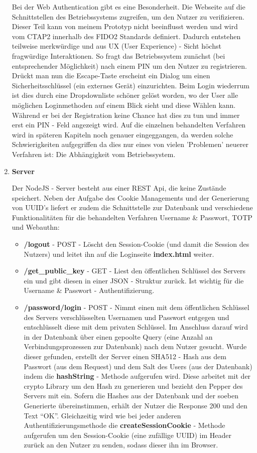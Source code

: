 \begin{enumerate}
Bei der Web Authentication gibt es eine Besonderheit. Die Webseite auf die Schnittstellen des Betriebssystems zugreifen, um den Nutzer zu verifizieren. Dieser Teil kann von meinem Prototyp nicht beeinflusst werden und wird vom CTAP2 innerhalb des FIDO2 Standards definiert. Dadurch entstehen teilweise merkwürdige und aus UX (User Experience) - Sicht höchst fragwürdige Interaktionen. So fragt das Betriebssystem zunächst (bei entsprechender Möglichkeit) nach einem PIN um den Nutzer zu registrieren. Drückt man nun die Escape-Taste erscheint ein Dialog um einen Sicherheitsschlüssel (ein externes Gerät) einzurichten. Beim Login wiederrum ist dies durch eine Dropdownliste schöner gelöst worden, wo der User alle möglichen Loginmethoden auf einem Blick sieht und diese Wählen kann. Während er bei der Registration keine Chance hat dies zu tun und immer erst ein PIN - Feld angezeigt wird. Auf die einzelnen behandelten Verfahren wird in späteren Kapiteln noch genauer eingeggangen, da werden solche Schwierigkeiten aufgegriffen da dies nur eines von vielen 'Problemen' neuerer Verfahren ist: Die Abhängigkeit vom Betriebssystem.

\item \textbf{Server}

Der NodeJS - Server besteht aus einer REST Api, die keine Zustände speichert. Neben der Aufgabe des Cookie Managements und der Generierung von UUID's liefert er zudem die Schnittstelle zur Datenbank und verschiedene Funktionalitäten für die behandelten Verfahren Username \& Passwort, TOTP und Webauthn:

\begin{itemize}
 \item \textbf{/logout} - POST - Löscht den Session-Cookie (und damit die Session des Nutzers) und leitet ihn auf die Loginseite \textbf{index.html} weiter.

 \item \textbf{/get\_public\_key} - GET - Liest den öffentlichen Schlüssel des Servers ein und gibt diesen in einer JSON - Struktur zurück. Ist wichtig für die Username \& Passwort - Authentifizierung.
 \newpage

 \item \textbf{/password/login} - POST - Nimmt einen mit dem öffentlichen Schlüssel des Servers verschlüsselten Usernamen und Passwort entgegen und entschlüsselt diese mit dem privaten Schlüssel. Im Anschluss darauf wird in der Datenbank über einen gepoolte Query (eine Anzahl an Verbindungsprozessen zur Datenbank) nach dem Nutzer gesucht. Wurde dieser gefunden, erstellt der Server einen SHA512 - Hash aus dem Passwort (aus dem Request) und dem Salt des Users (aus der Datenbank) indem die \textbf{hashString} - Methode aufgerufen wird. Diese arbeitet mit der crypto Library um den Hash zu generieren und bezieht den Pepper des Servers mit ein. Sofern die Hashes aus der Datenbank und der soeben Generierte übereinstimmen, erhält der Nutzer die Response 200 und den Text ``OK''. Gleichzeitig wird wie bei jeder anderen Authentifizierungsmethode die \textbf{createSessionCookie} - Methode aufgerufen um den Session-Cookie (eine zufällige UUID) im Header zurück an den Nutzer zu senden, sodass dieser ihn im Browser.
 

\end{itemize}
\end{enumerate}
